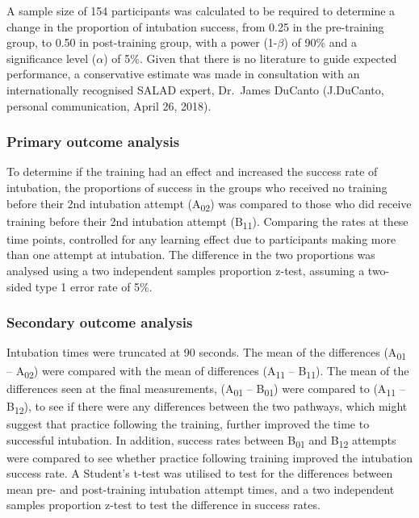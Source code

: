 \documentclass[]{article}
\begin{document}
A sample size of 154 participants was calculated to be required to
determine a change in the proportion of intubation success, from 0.25 in
the pre-training group, to 0.50 in post-training group, with a power
(1-\(\beta\)) of 90\% and a significance level (\(\alpha\)) of 5\%.
Given that there is no literature to guide expected performance, a
conservative estimate was made in consultation with an internationally
recognised SALAD expert, Dr.~James DuCanto (J.DuCanto, personal
communication, April 26, 2018).

\hypertarget{primary-outcome-analysis}{%
\subsubsection{Primary outcome
analysis}\label{primary-outcome-analysis}}

To determine if the training had an effect and increased the success
rate of intubation, the proportions of success in the groups who
received no training before their 2nd intubation attempt
(A\textsubscript{02}) was compared to those who did receive training
before their 2nd intubation attempt (B\textsubscript{11}). Comparing the
rates at these time points, controlled for any learning effect due to
participants making more than one attempt at intubation. The difference
in the two proportions was analysed using a two independent samples
proportion z-test, assuming a two-sided type 1 error rate of 5\%.

\hypertarget{secondary-outcome-analysis}{%
\subsubsection{Secondary outcome
analysis}\label{secondary-outcome-analysis}}

Intubation times were truncated at 90 seconds. The mean of the
differences (A\textsubscript{01} -- A\textsubscript{02}) were compared
with the mean of differences (A\textsubscript{11} --
B\textsubscript{11}). The mean of the differences seen at the final
measurements, (A\textsubscript{01} -- B\textsubscript{01}) were compared
to (A\textsubscript{11} -- B\textsubscript{12}), to see if there were
any differences between the two pathways, which might suggest that
practice following the training, further improved the time to successful
intubation. In addition, success rates between B\textsubscript{01} and
B\textsubscript{12} attempts were compared to see whether practice
following training improved the intubation success rate. A Student's
t-test was utilised to test for the differences between mean pre- and
post-training intubation attempt times, and a two independent samples
proportion z-test to test the difference in success rates.
\end{document}
